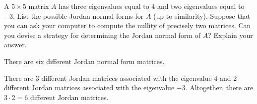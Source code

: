 \documentclass{ximera}
\begin{document}
\begin{exercise}  \label{c10.5.2B}
A $5\times 5$ matrix $A$ has three eigenvalues equal
to $4$ and two eigenvalues equal to $-3$.  List the possible Jordan normal 
forms for $A$ (up to similarity).  Suppose that you can ask your computer to
compute the nullity of precisely two matrices.  Can you devise a strategy for
determining the Jordan normal form of $A$?  Explain your answer.

\begin{solution}
\ans There are six different Jordan normal form matrices.

\soln  There are $3$ different Jordan matrices associated with the eigenvalue $4$ and
$2$ different Jordan matrices associated with the eigenvalue $-3$.  Altogether, there
are $3\cdot 2=6$ different Jordan matrices.


\end{solution}
\end{exercise}
\end{document}
